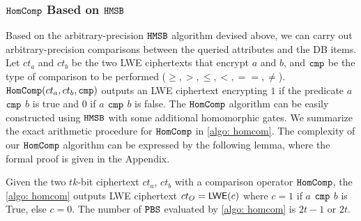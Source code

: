 \subsubsection{$\texttt{HomComp}$ Based on $\texttt{HMSB}$}
Based on the arbitrary-precision $\texttt{HMSB}$ algorithm devised above, we can carry
out arbitrary-precision comparisons between the queried attributes and the DB items.
Let $ct_a$ and $ct_b$ be the two LWE ciphertexts
that encrypt $a$ and $b$, and
${\texttt{cmp}}$ be the type of comparison to be performed ($\geq, >, \leq, <, ==, \ne$).
$\texttt{HomComp}(ct_a, ct_b, {\texttt{cmp}})$ 
outputs an LWE ciphertext encrypting $1$
if the predicate $a$ ${\texttt{cmp}}$ $b$ is true 
and $0$ if $a$ ${\texttt{cmp}}$ $b$ is false.
The $\texttt{HomComp}$ algorithm
can be easily constructed using $\texttt{HMSB}$
with some additional homomorphic gates.
We summarize the exact arithmetic procedure for
$\texttt{HomComp}$ in \cref{algo: homcom}. The complexity of our
$\texttt{HomComp}$ algorithm can be expressed by the following lemma,
where the formal proof is given in the Appendix.

\begin{lemma}
    Given the two $tk$-bit ciphertext $ct_a$, $ct_b$ with
    a comparison operator $\texttt{HomComp}$, the \cref{algo: homcom}
    outputs LWE ciphertext $ct_{O} = {\mathsf{LWE}}(c)$
    where $c = 1$ if $a$ ${\texttt{cmp}}$ $b$ is True, else $c = 0$.
    The number of $\texttt{PBS}$ evaluated by \cref{algo: homcom} 
    is $2t-1$ or $2t$.
    \label{lemma: homcomp}
\end{lemma}



            
            



